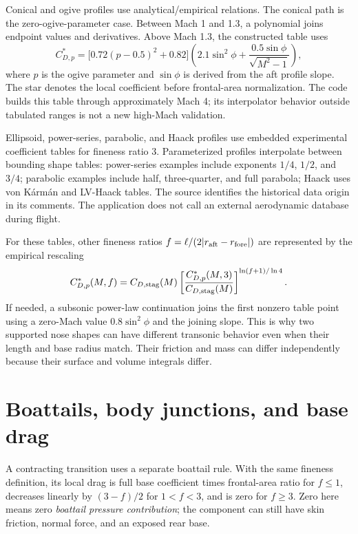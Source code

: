 Conical and ogive profiles use analytical/empirical relations. The conical path is the zero-ogive-parameter case. Between Mach 1 and 1.3, a polynomial joins endpoint values and derivatives. Above Mach 1.3, the constructed table uses
\begin{equation}
C_{D,p}^{*}=\bigl[0.72(p-0.5)^2+0.82\bigr]
\left(2.1\sin^2\phi+\frac{0.5\sin\phi}{\sqrt{M^2-1}}\right),
\end{equation}
where $p$ is the ogive parameter and $\sin\phi$ is derived from the aft profile slope. The star denotes the local coefficient before frontal-area normalization. The code builds this table through approximately Mach 4; its interpolator behavior outside tabulated ranges is not a new high-Mach validation.

Ellipsoid, power-series, parabolic, and Haack profiles use embedded experimental coefficient tables for fineness ratio 3. Parameterized profiles interpolate between bounding shape tables: power-series examples include exponents $1/4$, $1/2$, and $3/4$; parabolic examples include half, three-quarter, and full parabola; Haack uses von K\'arm\'an and LV-Haack tables. The source identifies the historical data origin in its comments. The application does not call an external aerodynamic database during flight.

For these tables, other fineness ratios $f=\ell/(2|r_{\rm aft}-r_{\rm fore}|)$ are represented by the empirical rescaling
\begin{equation}
C_{D,p}^{*}(M,f)=C_{D,\rm stag}(M)
\left[\frac{C_{D,p}^{*}(M,3)}{C_{D,\rm stag}(M)}\right]^{\ln(f+1)/\ln4}.
\end{equation}
If needed, a subsonic power-law continuation joins the first nonzero table point using a zero-Mach value $0.8\sin^2\phi$ and the joining slope. This is why two supported nose shapes can have different transonic behavior even when their length and base radius match. Their friction and mass can differ independently because their surface and volume integrals differ.

\section{Boattails, body junctions, and base drag}
A contracting transition uses a separate boattail rule. With the same fineness definition, its local drag is full base coefficient times frontal-area ratio for $f\leq1$, decreases linearly by $(3-f)/2$ for $1<f<3$, and is zero for $f\geq3$. Zero here means zero \emph{boattail pressure contribution}; the component can still have skin friction, normal force, and an exposed rear base.

